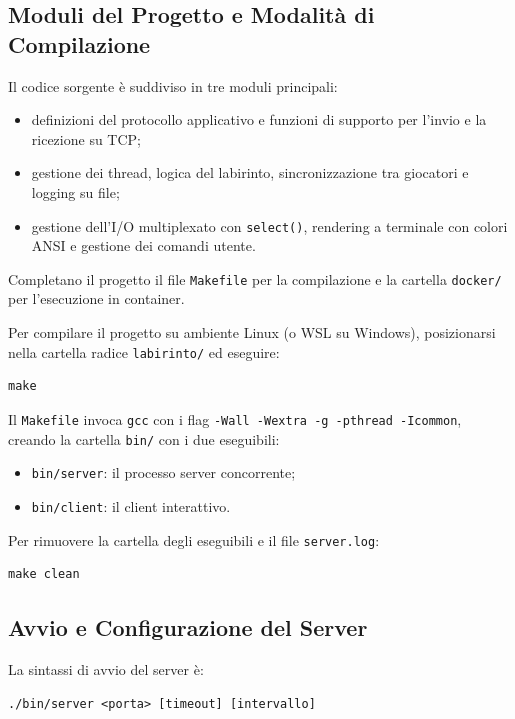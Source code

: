 \documentclass[11pt,a4paper]{article}
\begin{document}
\subsection{Moduli del Progetto e Modalità di Compilazione}

Il codice sorgente è suddiviso in tre moduli principali:
\begin{itemize}[leftmargin=1.8cm]
    \item[\texttt{common/}:] definizioni del protocollo applicativo e funzioni di supporto per l'invio e la ricezione su TCP;
    \item[\texttt{server/}:] gestione dei thread, logica del labirinto, sincronizzazione tra giocatori e logging su file;
    \item[\texttt{client/}:] gestione dell'I/O multiplexato con \texttt{select()}, rendering a terminale con colori ANSI e gestione dei comandi utente.
\end{itemize}

Completano il progetto il file \texttt{Makefile} per la compilazione e la cartella \texttt{docker/} per l'esecuzione in container.

Per compilare il progetto su ambiente Linux (o WSL su Windows), posizionarsi nella cartella radice \texttt{labirinto/} ed eseguire:
\begin{lstlisting}[style=bashstyle]
make
\end{lstlisting}

Il \texttt{Makefile} invoca \texttt{gcc} con i flag \texttt{-Wall -Wextra -g -pthread -Icommon}, creando la cartella \texttt{bin/} con i due eseguibili:
\begin{itemize}
    \item \texttt{bin/server}: il processo server concorrente;
    \item \texttt{bin/client}: il client interattivo.
\end{itemize}

Per rimuovere la cartella degli eseguibili e il file \texttt{server.log}:
\begin{lstlisting}[style=bashstyle]
make clean
\end{lstlisting}

\subsection{Avvio e Configurazione del Server}

La sintassi di avvio del server è:
\begin{lstlisting}[style=bashstyle]
./bin/server <porta> [timeout] [intervallo]
\end{lstlisting}
\end{document}
